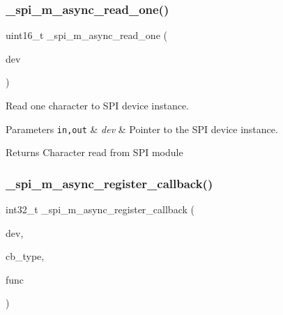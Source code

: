 \subsubsection{\texorpdfstring{\+\_\+spi\+\_\+m\+\_\+async\+\_\+read\+\_\+one()}{\_spi\_m\_async\_read\_one()}}
{\footnotesize\ttfamily uint16\+\_\+t \+\_\+spi\+\_\+m\+\_\+async\+\_\+read\+\_\+one (\begin{DoxyParamCaption}\item[{struct \hyperlink{group__hpl__spi_gaab37ebaab3686617eb20d5d175e82e6a}{\+\_\+spi\+\_\+m\+\_\+async\+\_\+dev} $\ast$}]{dev }\end{DoxyParamCaption})}



Read one character to S\+PI device instance. 


\begin{DoxyParams}[1]{Parameters}
\mbox{\tt in,out}  & {\em dev} & Pointer to the S\+PI device instance.\\
\hline
\end{DoxyParams}
\begin{DoxyReturn}{Returns}
Character read from S\+PI module 
\end{DoxyReturn}
\mbox{\label{group__hpl__spi_ga8ded12d6ee42cc5265a9d5c43e042315}} 
\subsubsection{\texorpdfstring{\+\_\+spi\+\_\+m\+\_\+async\+\_\+register\+\_\+callback()}{\_spi\_m\_async\_register\_callback()}}
{\footnotesize\ttfamily int32\+\_\+t \+\_\+spi\+\_\+m\+\_\+async\+\_\+register\+\_\+callback (\begin{DoxyParamCaption}\item[{struct \hyperlink{group__hpl__spi_gaab37ebaab3686617eb20d5d175e82e6a}{\+\_\+spi\+\_\+m\+\_\+async\+\_\+dev} $\ast$}]{dev,  }\item[{const enum \+\_\+spi\+\_\+m\+\_\+async\+\_\+dev\+\_\+cb\+\_\+type}]{cb\+\_\+type,  }\item[{const \hyperlink{group__doc__driver__hal__utils__macro_gae40b38bc5f5a5bd452bdd59c67d9a9cf}{F\+U\+N\+C\+\_\+\+P\+TR}}]{func }\end{DoxyParamCaption})}



